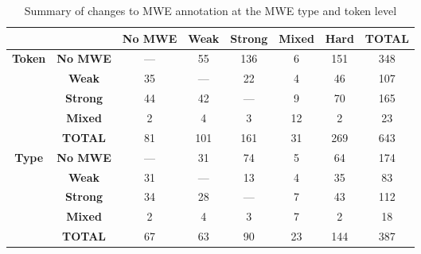 \documentclass[output=paper
,modfonts
,nonflat]{langsci/langscibook}
\newcommand{\zp}{\phantom{0}}
\begin{document}
\begin{table*}[t!]
\begin{tabular}{c c c c c c c c} %
\toprule %
&&\textbf{No MWE}&\textbf{Weak}&\textbf{Strong}&\textbf{Mixed}&\textbf{Hard}&\textbf{TOTAL}\\
\midrule

\multirow{4}{*}{\textbf{Token}}&\textbf{No MWE}  &--- &\zp 55 & 136 &\zp6& 151  &348\\
&\textbf{Weak}                                   &35  &\zp--- & \zp22&\zp4& \zp46 &107\\
&\textbf{Strong}                                 &44  &\zp42  &---  &\zp9&\zp70  &165\\
&\textbf{Mixed}                                  &\zp2 &\zp\zp4 &\zp\zp3&12 &\zp\zp2 &\zp23\\
\cmidrule{2-8}
&\textbf{TOTAL}                                  &81  &101   &161  &31 &269   &643\\
\midrule
\multirow{4}{*}{\textbf{Type}}&\textbf{No MWE}   &--- &\zp31  &\zp74 &\zp5&\zp64  &174\\
&\textbf{Weak}                                   &31  &---   &\zp13 &\zp4&\zp35  &\zp83\\
&\textbf{Strong}                                 &34  &\zp28  &---  &\zp7&\zp43  &112\\
&\textbf{Mixed}                                  &\zp2 &\zp\zp4 &\zp\zp3&\zp7&\zp\zp2 &\zp18\\
\cmidrule{2-8}
&\textbf{TOTAL}                                  &67  &\zp63  &\zp90 &23 &144   &387\\
\bottomrule
\end{tabular}%
\caption{Summary of changes to MWE annotation at the MWE type and token level} %
\label{tab:changes} %
\end{table*}
\end{document}
